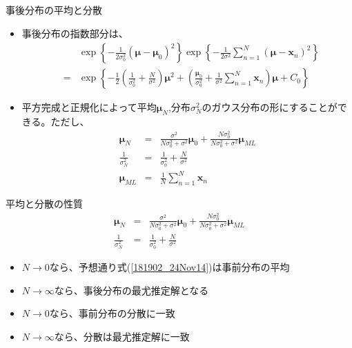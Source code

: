 \begin{frame}{事後分布の平均と分散}
 \begin{itemize}
  \item 事後分布の指数部分は、
        \begin{eqnarray}
         & &\exp\left\{-\frac{1}{2\sigma_0^2}(\bm{\mu}-\bm{\mu}_0)^2\right\} \exp\left\{-\frac{1}{2\sigma^2}\sum_{n=1}^{N}(\bm{\mu}-\bm{x}_n)^2\right\} \nonumber \\
         &= & \exp\left\{-\frac{1}{2}\left(\frac{1}{\sigma_0^2}+\frac{N}{\sigma^2}\right)\bm{\mu}^2 +\left(\frac{\bm{\mu}_0}{\sigma_0^2}+\frac{1}{\sigma^2}\sum_{n=1}^{N}\bm{x}_n\right)\bm{\mu} +C_0 \right\} \nonumber
        \end{eqnarray}
  \item 平方完成と正規化によって平均$\bm{\mu}_N$,分布$\sigma_N^2$のガウス分布の形にすることができる。ただし、
        \begin{eqnarray}
         \bm{\mu}_N& = & \frac{\sigma^2}{N\sigma_0^2+\sigma^2}\bm{\mu}_0 + \frac{N\sigma_0^2}{N\sigma_0^2+\sigma^2}\bm{\mu}_{ML}\label{223654_18Nov14}\\
         \frac{1}{\sigma_N^2}&= & \frac{1}{\sigma_0^2} + \frac{N}{\sigma^2}\label{181817_24Nov14}\\
         \bm{\mu}_{ML}&= & \frac{1}{N}\sum_{n=1}^{N}\bm{x}_n
        \end{eqnarray}
 \end{itemize}
\end{frame}

\begin{frame}{平均と分散の性質}
 \begin{eqnarray}
  \bm{\mu}_N& = & \frac{\sigma^2}{N\sigma_0^2+\sigma^2}\bm{\mu}_0 + \frac{N\sigma_0^2}{N\sigma_0^2+\sigma^2}\bm{\mu}_{ML}\label{181902_24Nov14}\\
  \frac{1}{\sigma_N^2}&= & \frac{1}{\sigma_0^2} + \frac{N}{\sigma^2}
 \end{eqnarray}
 \begin{itemize}
  \item $N\rightarrow0$なら、予想通り式(\ref{181902_24Nov14})は事前分布の平均
  \item $N\rightarrow\infty$なら、事後分布の最尤推定解となる
  \item $N\rightarrow0$なら、事前分布の分散に一致
  \item $N\rightarrow\infty$なら、分散は最尤推定解に一致
 \end{itemize}
\end{frame}


